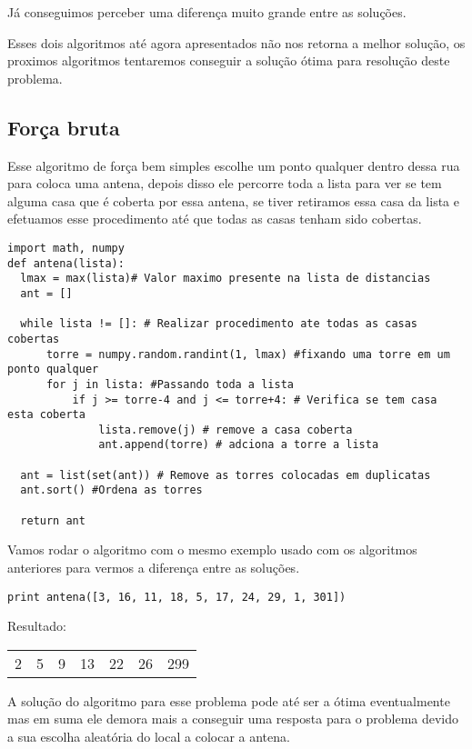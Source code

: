 \documentclass[11pt]{article}
\begin{document}
Já conseguimos perceber uma diferença muito grande entre as soluções.

Esses dois algoritmos até agora apresentados não nos retorna a melhor
solução, os proximos algoritmos tentaremos conseguir a solução ótima
para resolução deste problema.

\subsection{Força bruta}
\label{sec-3-2}
\label{sec-3-2}

Esse algoritmo de força bem simples escolhe um ponto qualquer dentro
dessa rua para coloca uma antena, depois disso ele percorre toda a
lista para ver se tem alguma casa que é coberta por essa antena, se
tiver retiramos essa casa da lista e efetuamos esse procedimento até
que todas as casas tenham sido cobertas.


\begin{verbatim}
import math, numpy
def antena(lista):
  lmax = max(lista)# Valor maximo presente na lista de distancias
  ant = []

  while lista != []: # Realizar procedimento ate todas as casas cobertas
      torre = numpy.random.randint(1, lmax) #fixando uma torre em um ponto qualquer
      for j in lista: #Passando toda a lista
          if j >= torre-4 and j <= torre+4: # Verifica se tem casa esta coberta
              lista.remove(j) # remove a casa coberta
              ant.append(torre) # adciona a torre a lista

  ant = list(set(ant)) # Remove as torres colocadas em duplicatas
  ant.sort() #Ordena as torres

  return ant
\end{verbatim}

Vamos rodar o algoritmo com o mesmo exemplo usado com os algoritmos
anteriores para vermos a diferença entre as soluções.


\begin{verbatim}
print antena([3, 16, 11, 18, 5, 17, 24, 29, 1, 301])
\end{verbatim}

Resultado:
\begin{center}
\begin{tabular}{rrrrrrr}
2 & 5 & 9 & 13 & 22 & 26 & 299\\
\end{tabular}
\end{center}

A solução do algoritmo para esse problema pode até ser a ótima
eventualmente mas em suma ele demora mais a conseguir uma resposta
para o problema devido a sua escolha aleatória do local a colocar a
antena.
\end{document}
